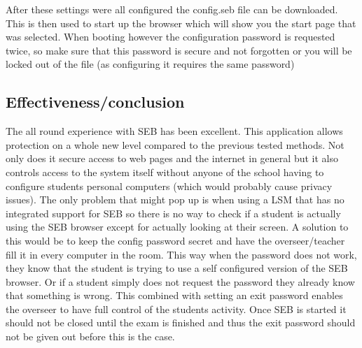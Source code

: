 After these settings were all configured the config.seb file can be downloaded. This is then used to start up the browser which will show you the start page that was selected. When booting however the configuration password is requested twice, so make sure that this password is secure and not forgotten or you will be locked out of the file (as configuring it requires the same password)
\subsection{Effectiveness/conclusion}
The all round experience with SEB has been excellent. This application allows protection on a whole new level compared to the previous tested methods. Not only does it secure access to web pages and the internet in general but it also controls access to the system itself without anyone of the school having to configure students personal computers (which would probably cause  privacy issues). The only problem that might pop up is when using a LSM that has no integrated support for SEB so there is no way to check if a student is actually using the SEB browser except for actually looking at their screen. A solution to this would be to keep the config password secret and have the overseer/teacher fill it in every computer in the room. This way when the password does not work, they know that the student is trying to use a self configured version of the SEB browser. Or if a student simply does not request the password they already know that something is wrong. This combined with setting an exit password enables the overseer to have full control of the students activity. Once SEB is started it should not be closed until the exam is finished and thus the exit password should not be given out before this is the case.